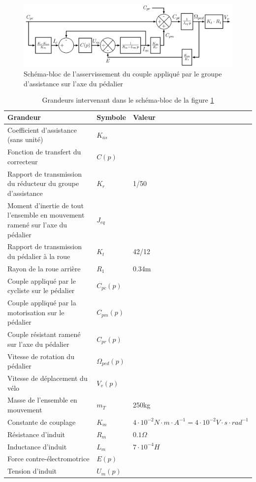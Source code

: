 \begin{figure}[ht!]
\begin{center}
\includegraphics[width=.9\linewidth]{img/fig17}
\caption{\label{fig17}Schéma-bloc de l’asservissement du couple appliqué par le groupe d’assistance sur l’axe du pédalier}
\end{center}
\end{figure}

\newpage

\begin{table}[ht!]
\begin{tabular}{|p{0.7\linewidth}|p{0.1\linewidth}|p{0.2\linewidth}|}
\hline
\textbf{Grandeur} & \textbf{Symbole} & \textbf{Valeur} \\
\hline
Coefficient d’assistance (sans unité) & $K_{as}$ & \\
Fonction de transfert du correcteur & $C(p)$ & \\
\hline
Rapport de transmission du réducteur du groupe d’assistance & $K_r$ & 1/50 \\
Moment d’inertie de tout l’ensemble en mouvement ramené sur l’axe du pédalier & $J_{eq}$ & \\
Rapport de transmission du pédalier à la roue & $K_t$ & 42/12 \\
Rayon de la roue arrière & $R_1$ & 0.34m \\
Couple appliqué par le cycliste sur le pédalier & $C_{pc}(p)$ & \\
Couple appliqué par la motorisation sur le pédalier & $C_{pm}(p)$ & \\
Couple résistant ramené sur l’axe du pédalier & $C_{pr}(p)$ & \\
Vitesse de rotation du pédalier & $\Omega_{ped}(p)$ & \\ 
Vitesse de déplacement du vélo & $V_v(p)$ & \\
Masse de l’ensemble en mouvement & $m_T$ & 250kg\\
\hline
Constante de couplage & $K_m$ & $4\cdot 10^{-2}N\cdot m\cdot A^{-1}=4\cdot 10^{-2}V\cdot s\cdot rad^{-1}$\\
Résistance d’induit & $R_m$ & $0.1\Omega$ \\
Inductance d’induit & $L_m$ & $7\cdot 10^{-4}H$ \\
Force contre-électromotrice & $E(p)$ & \\
Tension d’induit & $U_m(p)$ &\\
\hline
\end{tabular}
\caption{\label{tab01}Grandeurs intervenant dans le schéma-bloc de la figure \ref{fig17}}
\end{table}

